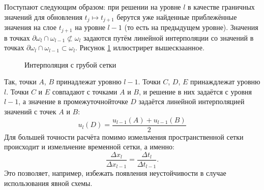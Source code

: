 Поступают следующим образом: при решении на уровне $l$ в качестве граничных значений для обновления $t_j \mapsto t_{j + 1}$ берутся уже найденные приблежённые значения на слое $t_{j + 1}$ на уровне $l - 1$ (то есть на предыдущем уровне).
Значения в точках $\partial \omega_l \cap \omega_{l - 1} \not\subset \omega_{l}$ задаются путём линейной интерполяции со значений в точках $\partial \omega_l \cap \omega_{l - 1} \subset \omega_{l}$.
Рисунок \ref{fig:linear_interpolation} иллюстрирет вышескзаанное.
\begin{figure}[h]
    \centering
    \caption{Интерполяция с грубой сетки}
    \label{fig:linear_interpolation}
\end{figure}
Так, точки $A$, $B$ принадлежат уровню $l - 1$.
Точки $C$, $D$, $E$ принаждлежат уровню $l$.
Точки $C$ и $E$ совпадают с точками $A$ и $B$, и решение в них задаётся с уровня $l - 1$, а значение в \glqq промежуточной\grqq точке $D$ задаётся линейной интерполяцией значений с точек $A$ и $B$:
\begin{equation*}
    u_l(D) = \frac{u_{l - 1}(A) + u_{l - 1}(B)}{2}
\end{equation*}
Для большей точности расчёта помимо измельчения пространственной сетки происходит и измельчение временной сетки, а именно:
\begin{equation}\label{eq:frac_time_step}
    \frac{\Delta x_{l}}{\Delta x_{l - 1}} = \frac{\Delta t_{l}}{\Delta t_{l - 1}}.
\end{equation}
Это позволяет, например, избежать появления неустойчивости в случае использования явной схемы.